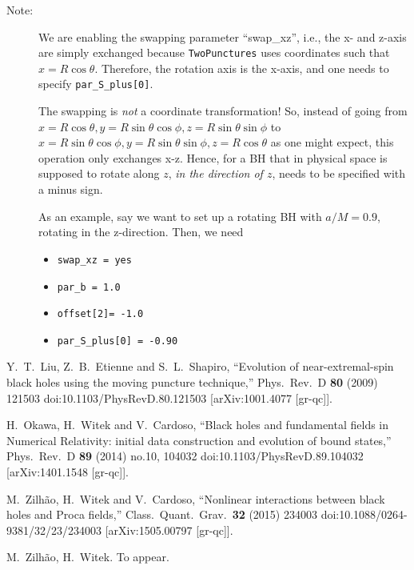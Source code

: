 \begin{description}

\item[Note:] We are enabling the swapping parameter ``swap\_xz'', i.e., the x- and
  z-axis are simply exchanged because \texttt{TwoPunctures} uses coordinates such that
  $x=R\cos\theta$.  Therefore, the rotation axis is the x-axis, and one needs to
  specify \texttt{par\_S\_plus[0]}.

  The swapping is \emph{not} a coordinate transformation!  So, instead of
  going from $x=R\cos\theta, y=R\sin\theta\cos\phi, z=R\sin\theta\sin\phi$ to
  $x=R\sin\theta\cos\phi, y=R\sin\theta\sin\phi, z=R\cos\theta$ as one might
  expect, this operation only exchanges x-z.  Hence, for a BH that in physical
  space is supposed to rotate along $z$, \emph{in the direction of $z$}, needs
  to be specified with a minus sign.

  As an example, say we want to set up a rotating BH with $a/M = 0.9$, rotating
  in the z-direction. Then, we need
    \begin{itemize}
    \item \texttt{swap\_xz = yes}
    \item \texttt{par\_b = 1.0}
    \item \texttt{offset[2]= -1.0}
    \item \texttt{par\_S\_plus[0] = -0.90}
    \end{itemize}

\end{description}






\begin{thebibliography}{9}

  Y.~T.~Liu, Z.~B.~Etienne and S.~L.~Shapiro,
  ``Evolution of near-extremal-spin black holes using the moving puncture technique,''
  Phys.\ Rev.\ D {\bf 80} (2009) 121503
  doi:10.1103/PhysRevD.80.121503
  [arXiv:1001.4077 [gr-qc]].

  H.~Okawa, H.~Witek and V.~Cardoso,
  ``Black holes and fundamental fields in Numerical Relativity: initial data construction and evolution of bound states,''
  Phys.\ Rev.\ D {\bf 89} (2014) no.10,  104032
  doi:10.1103/PhysRevD.89.104032
  [arXiv:1401.1548 [gr-qc]].

  M.~Zilh\~ao, H.~Witek and V.~Cardoso,
  ``Nonlinear interactions between black holes and Proca fields,''
  Class.\ Quant.\ Grav.\  {\bf 32} (2015) 234003
  doi:10.1088/0264-9381/32/23/234003
  [arXiv:1505.00797 [gr-qc]].

  M.~Zilh\~ao, H.~Witek. To appear.


\end{thebibliography}



